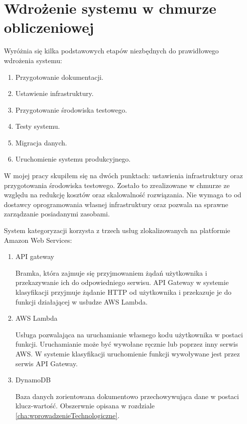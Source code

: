 \chapter{Wdrożenie systemu w chmurze obliczeniowej}

Wyróżnia się kilka podstawowych etapów niezbędnych do prawidłowego wdrożenia systemu:

\begin{enumerate}
    \item Przygotowanie dokumentacji.
    \item Ustawienie infrastruktury.
    \item Przygotowanie środowiska testowego.
    \item Testy systemu.
    \item Migracja danych.
    \item Uruchomienie systemu produkcyjnego.
\end{enumerate}

W mojej pracy skupiłem się na dwóch punktach: ustawienia infrastruktury oraz przygotowania środowiska testowego. Zostało to zrealizowane w chmurze ze względu na redukcję kosztów oraz skalowalność rozwiązania. Nie wymaga to od dostawcy oprogramowania własnej infrastruktury oraz pozwala na sprawne zarządzanie posiadanymi zasobami.

System kategoryzacji korzysta z trzech usług zlokalizowanych na platformie Amazon Web Services:

\begin{enumerate}
    \item API gateway
    
    Bramka, która zajmuje się przyjmowaniem żądań użytkownika i przekazywanie ich do odpowiedniego serwisu. API Gateway w systemie klasyfikacji przyjmuje żądanie HTTP od użytkownika i przekazuje je do funkcji działającej w usłudze AWS Lambda.
    
    \item AWS Lambda
    
    Usługa pozwalająca na uruchamianie własnego kodu użytkownika w postaci funkcji. Uruchamianie może być wywołane ręcznie lub poprzez inny serwis AWS. W systemie klasyfikacji uruchomienie funkcji wywoływane jest przez serwis API Gateway.
    
    \item DynamoDB
    
    Baza danych zorientowana dokumentowo przechowywująca dane w postaci klucz-wartość. Obszerwnie opisana w rozdziale \ref{cha:wprowadzenieTechnologiczne}.
\end{enumerate}

